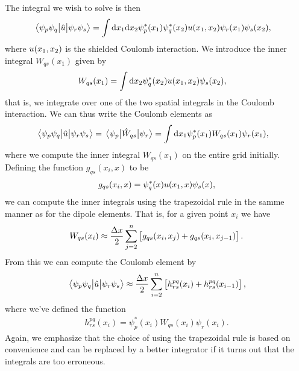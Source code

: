         The integral we wish to solve is then
        \begin{align}
            \mel{\psi_{p}\psi_{q}}{\hat{u}}{\psi_{r}\psi_{s}}
            &=
            \int\dd x_1 \dd x_2
            \psi^{*}_{p}(x_1)\psi^{*}_{q}(x_2)
            u(x_1, x_2)
            \psi_{r}(x_1)
            \psi_{s}(x_2),
        \end{align}
        where $u(x_1, x_2)$ is the shielded Coulomb interaction.
        We introduce the inner integral $W_{qs}(x_1)$ given by
        \begin{align}
            W_{qs}(x_1)
            &= \int\dd x_2
            \psi^{*}_{q}(x_2) u(x_1, x_2)
            \psi_{s}(x_2),
        \end{align}
        that is, we integrate over one of the two spatial integrals in the
        Coulomb interaction.
        We can thus write the Coulomb elements as
        \begin{align}
            \mel{\psi_{p}\psi_{q}}{\hat{u}}{\psi_{r}\psi_{s}}
            &=
            \mel{\psi_{p}}{\hat{W}_{qs}}{\psi_{r}}
            =
            \int\dd x_1
            \psi^{*}_{p}(x_1)
            W_{qs}(x_1)
            \psi_{r}(x_1),
        \end{align}
        where we compute the inner integral $W_{qs}(x_1)$ on the entire grid
        initially.
        Defining the function $g_{qs}(x_i, x)$ to be
        \begin{align}
            g_{qs}(x_i, x) = \psi^{*}_{q}(x) u(x_1, x) \psi_s(x),
        \end{align}
        we can compute the inner integrals using the trapezoidal rule in the
        samme manner as for the dipole elements.
        That is, for a given point $x_i$ we have
        \begin{align}
            W_{qs}(x_i)
            \approx \frac{\Delta x}{2}
            \sum_{j = 2}^{n}
            \left[ 
                g_{qs}(x_i, x_j) + g_{qs}(x_i, x_{j - 1})
             \right].
        \end{align}
        From this we can compute the Coulomb element by
        \begin{align}
            \mel{\psi_{p}\psi_{q}}{\hat{u}}{\psi_{r}\psi_{s}}
            \approx
            \frac{\Delta x}{2}
            \sum_{i = 2}^{n}
            \left[ 
                h^{pq}_{rs}(x_i) + h^{pq}_{rs}(x_{i - 1})
             \right],
        \end{align}
        where we've defined the function
        \begin{align}
            h^{pq}_{rs}(x_i)
            = \psi^{*}_{p}(x_i) W_{qs}(x_i) \psi_{r}(x_i).
        \end{align}
        Again, we emphasize that the choice of using the trapezoidal rule is
        based on convenience and can be replaced by a better integrator if it
        turns out that the integrals are too erroneous.


